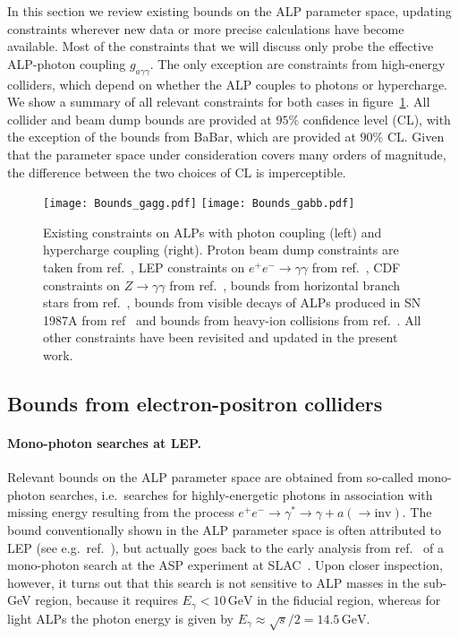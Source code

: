 \documentclass[11pt,a4paper]{article}
\newcommand{\ga}{g_{a\gamma\gamma}}
\def \babar {BaBar\xspace}
\begin{document}
In this section we review existing bounds on the ALP parameter space, updating constraints wherever new data or more precise calculations have become available. Most of the constraints that we will discuss only probe the effective ALP-photon coupling $\ga$. The only exception are constraints from high-energy colliders, which depend on whether the ALP couples to photons or hypercharge. We show a summary of all relevant constraints for both cases in figure~\ref{fig:constraints}. All collider and beam dump bounds are provided at $95\%$ confidence level (CL), with the exception of the bounds from \babar, which are provided at $90\%$ CL. Given that the parameter space under consideration covers many orders of magnitude, the difference between the two choices of CL is imperceptible.

\begin{figure}
\centering
\texttt{[image: Bounds\_gagg.pdf]}\qquad
\texttt{[image: Bounds\_gabb.pdf]}
\caption{\label{fig:constraints} Existing constraints on ALPs with photon coupling (left) and hypercharge coupling (right). Proton beam dump constraints are taken from ref.~\cite{Dobrich:2015jyk}, LEP constraints on $e^+ e^- \to \gamma \gamma$ from ref.~\cite{Jaeckel:2015jla}, CDF constraints on $Z \to \gamma\gamma$ from ref.~\cite{Bauer:2017ris}, bounds from horizontal branch stars from ref.~\cite{Cadamuro:2011fd}, bounds from visible decays of ALPs produced in SN 1987A from ref~\cite{Jaeckel:2017tud} and bounds from heavy-ion collisions from ref.~\cite{Knapen:2017ebd}. All other constraints have been revisited and updated in the present work.}
\end{figure}

\subsection{Bounds from electron-positron colliders}

\paragraph{Mono-photon searches at LEP.}

Relevant bounds on the ALP parameter space are obtained from so-called mono-photon searches, i.e.\ searches for highly-energetic photons in association with missing energy resulting from the process $e^+ e^- \to \gamma^\ast \to \gamma + a (\to \text{inv})$. The bound conventionally shown in the ALP parameter space is often attributed to LEP (see e.g.\ ref.~\cite{Mimasu:2014nea}), but actually goes back to the early analysis from ref.~\cite{Masso:1995tw} of a mono-photon search at the ASP experiment at SLAC~\cite{Hearty:1989pq}. Upon closer inspection, however, it turns out that this search is not sensitive to ALP masses in the sub-GeV region, because it requires $E_\gamma < 10\,\text{GeV}$ in the fiducial region, whereas for light ALPs the photon energy is given by $E_\gamma \approx \sqrt{s} / 2 = 14.5\,\mathrm{GeV}$.
\end{document}
